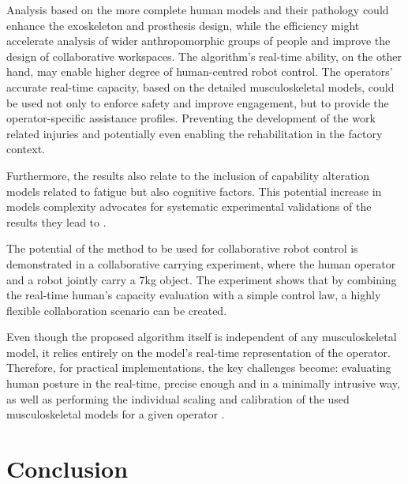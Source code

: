 Analysis based on the more complete human models and their pathology could enhance the exoskeleton and prosthesis design, while the efficiency might accelerate analysis of wider anthropomorphic groups of people and improve the design of collaborative workspaces. The algorithm's real-time ability, on the other hand, may enable higher degree of human-centred robot control. The operators' accurate real-time capacity, based on the detailed musculoskeletal models, could be used not only to enforce safety and improve engagement, but to provide the operator-specific assistance profiles. Preventing the development of the work related injuries and potentially even enabling the rehabilitation in the factory context.

Furthermore, the results also relate to the inclusion of capability alteration models related to fatigue but also cognitive factors. This potential increase in models complexity advocates for systematic experimental validations of the results they lead to \cite{biomechanics1010008}.

The potential of the method to be used for collaborative robot control is demonstrated in a collaborative carrying experiment, where the human operator and a robot jointly carry a 7kg object. The experiment shows that by combining the real-time human's capacity evaluation with a simple control law, a highly flexible collaboration scenario can be created. 

Even though the proposed algorithm itself is independent of any musculoskeletal model, it relies entirely on the model's real-time representation of the operator. Therefore, for practical implementations, the key challenges become: evaluating human posture in the real-time, precise enough and in a minimally intrusive way, as well as performing the individual scaling and calibration of the used musculoskeletal models for a given operator \cite{correa20112782}.


\section{Conclusion}

